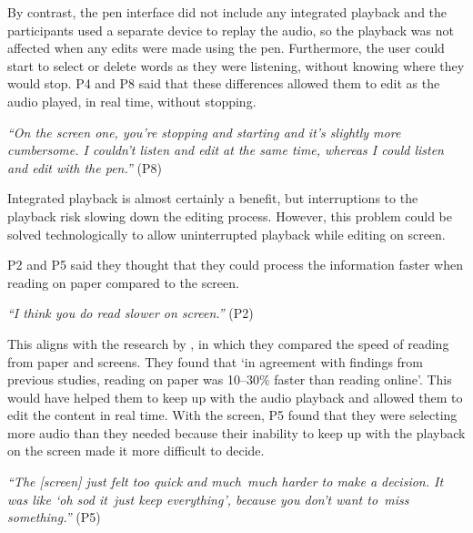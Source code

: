 By contrast, the pen interface did not include any integrated playback and the participants used a separate device to
replay the audio, so the playback was not affected when any edits were made using the pen. Furthermore, the user could
start to select or delete words as they were listening, without knowing where they would stop.  P4 and P8 said that
these differences allowed them to edit as the audio played, in real time, without stopping.

\textit{``On the screen one, you're stopping and starting and it's slightly more cumbersome. I couldn't listen and edit
at the same time, whereas I could listen and edit with the pen.''} (P8)

Integrated playback is almost certainly a benefit, but interruptions to the playback risk slowing down the editing
process. However, this problem could be solved technologically to allow uninterrupted playback while editing on screen.


P2 and P5 said they thought that they could process the information faster when reading on paper compared to the
screen.

\textit{``I think you do read slower on screen.''} (P2)

This aligns with the research by \cite{Kurniawan2001}, in which they compared the speed of reading from paper and
screens. They found that `in agreement with findings from previous studies, reading on paper was 10--30\% faster than
reading online'.  This would have helped them to keep up with the audio playback and allowed them to edit the content
in real time. With the screen, P5 found that they were selecting more audio than they needed because their inability to
keep up with the playback on the screen made it more difficult to decide.

\textit{``The [screen] just felt too quick and much much harder to make a decision. It was like `oh sod it just keep
everything', because you don't want to miss something.''} (P5)


